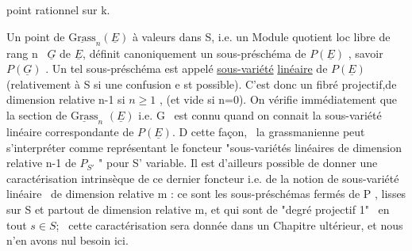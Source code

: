 
point rationnel sur k.

Un point de $\underline{\mathrm{Grass}}_n(\underline{E})$ à valeurs dans S, i.e. un Module quotient
loc libre de rang n \ $\underline{G}$ de $\underline{E}$, définit canoniquement un sous-préschéma
de $P(\underline{E})$ , savoir $P(\underline{G})$ . Un tel sous-préschéma est appelé \uline{sous-variété}
\uline{linéaire} de $P(\underline{E})$ (relativement à S si une confusion e st possible).
C'est donc un fibré projectif,de dimension relative n-1 si $n\geqslant 1$ ,
(et vide si n=0). On vérifie immédiatement que la section de $\underline{\mathrm{Grass}}_n$
$(\underline{E})$ i.e. G \ est connu quand on connait la sous-variété linéaire
correspondante de $P(\underline{E})$. D cette façon, \ la grassmanienne peut
s'interpréter comme représentant le foncteur "sous-variétés linéaires
de dimension relative n-1  de $P_{S'}$ " pour S'
variable. Il est d'ailleurs possible de donner une caractérisation
intrinsèque de ce dernier foncteur i.e. de la notion de sous-variété
linéaire \ de dimension relative m : ce sont les sous-préschémas fermés
de P , lisses sur S et partout de dimension relative m, et qui sont
de "degré projectif 1" \ en tout $s\in S$; \ cette caractérisation sera
donnée dans un Chapitre ultérieur, et nous n'en avons nul besoin ici.

